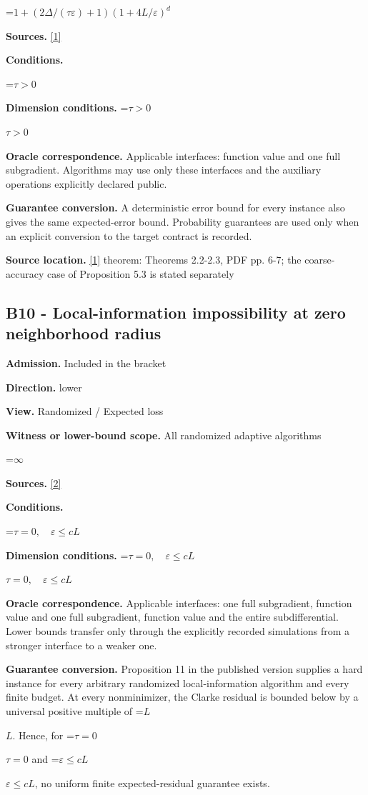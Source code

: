 \documentclass[10pt,a4paper]{article}
\newcommand{\AtlasMath}[1]{\par\begingroup\centering\setbox0=\hbox{$\displaystyle #1$}\ifdim\wd0>1.4\linewidth\typeout{ATLAS WIDE FORMULA: \the\wd0}\fi\ifdim\wd0>\linewidth\resizebox{\linewidth}{!}{\box0}\else\box0\fi\par\endgroup}
\newcommand{\AtlasInlineMath}[1]{\begingroup\setbox0=\hbox{$#1$}\ifdim\wd0>.4\linewidth\endgroup\AtlasMath{#1}\else\endgroup$#1$\fi}
\begin{document}
\AtlasMath{1+(2\Delta/(\tau\varepsilon)+1)(1+4L/\varepsilon)^d}
\textbf{Sources.} \href{https://arxiv.org/pdf/2609.38082v2}{[1]}

\textbf{Conditions.} 
\AtlasMath{\tau>0}


\textbf{Dimension conditions.} \AtlasInlineMath{\tau>0}

\textbf{Oracle correspondence.} Applicable interfaces: function value and one full subgradient. Algorithms may use only these interfaces and the auxiliary operations explicitly declared public.

\textbf{Guarantee conversion.} A deterministic error bound for every instance also gives the same expected-error bound. Probability guarantees are used only when an explicit conversion to the target contract is recorded.

\textbf{Source location.} \href{https://arxiv.org/pdf/2609.38082v2}{[1]} theorem: Theorems 2.2-2.3, PDF pp. 6-7; the coarse-accuracy case of Proposition 5.3 is stated separately

\subsection{B10 - Local-information impossibility at zero neighborhood radius}
\textbf{Admission.} Included in the bracket

\textbf{Direction.} lower

\textbf{View.} Randomized / Expected loss

\textbf{Witness or lower-bound scope.} All randomized adaptive algorithms

\AtlasMath{\infty}
\textbf{Sources.} \href{https://www.jmlr.org/papers/volume23/21-1507/21-1507.pdf}{[2]}

\textbf{Conditions.} 
\AtlasMath{\tau=0,\quad\varepsilon\le cL}


\textbf{Dimension conditions.} \AtlasInlineMath{\tau=0,\quad\varepsilon\le cL}

\textbf{Oracle correspondence.} Applicable interfaces: one full subgradient, function value and one full subgradient, function value and the entire subdifferential. Lower bounds transfer only through the explicitly recorded simulations from a stronger interface to a weaker one.

\textbf{Guarantee conversion.} Proposition 11 in the published version supplies a hard instance for every arbitrary randomized local-information algorithm and every finite budget. At every nonminimizer, the Clarke residual is bounded below by a universal positive multiple of \AtlasInlineMath{L}. Hence, for \AtlasInlineMath{\tau=0} and \AtlasInlineMath{\varepsilon\le cL}, no uniform finite expected-residual guarantee exists.
\end{document}
